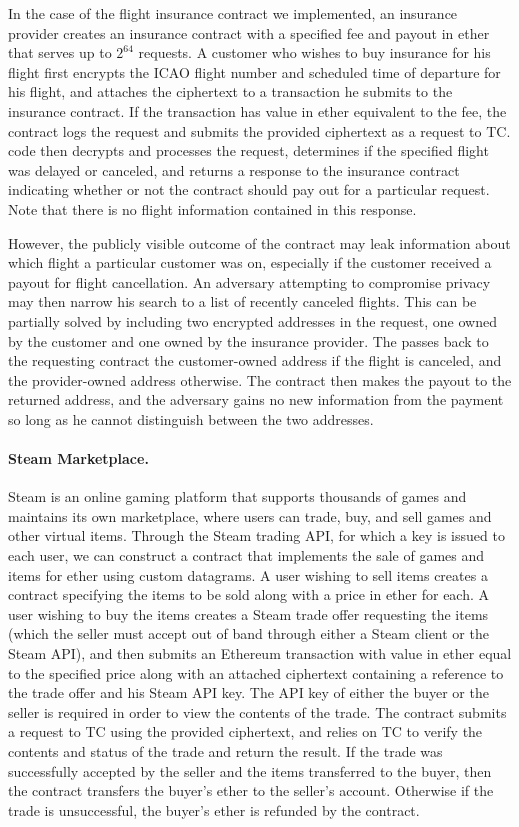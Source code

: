 In the case of the flight insurance contract we implemented, an insurance provider creates an insurance contract with a specified fee and payout in ether that serves up to $2^{64}$ requests.  A customer who wishes to buy insurance for his flight first encrypts the ICAO flight number and scheduled time of departure for his flight, and attaches the ciphertext to a transaction he submits to the insurance contract.  If the transaction has value in ether equivalent to the fee, the contract logs the request and submits the provided ciphertext as a request to TC.  \encname code then decrypts and processes the request, determines if the specified flight was delayed or canceled, and returns a response to the insurance contract indicating whether or not the contract should pay out for a particular request.  Note that there is no flight information contained in this response.

However, the publicly visible outcome of the contract may leak information about which flight a particular customer was on, especially if the customer received a payout for flight cancellation.  An adversary attempting to compromise privacy may then narrow his search to a list of recently canceled flights.  This can be partially solved by including two encrypted addresses in the request, one owned by the customer and one owned by the insurance provider.  The \encname passes back to the requesting contract the customer-owned address if the flight is canceled, and the provider-owned address otherwise.  The contract then makes the payout to the returned address, and the adversary gains no new information from the payment so long as he cannot distinguish between the two addresses.

\paragraph{Steam Marketplace.} Steam  is an online gaming platform that supports thousands of games and maintains its own marketplace, where users can trade, buy, and sell games and other virtual items.  Through the Steam trading API, for which a key is issued to each user, we can construct a contract that implements the sale of games and items for ether using custom datagrams.  A user wishing to sell items creates a contract specifying the items to be sold along with a price in ether for each.  A user wishing to buy the items creates a Steam trade offer requesting the items (which the seller must accept out of band through either a Steam client or the Steam API), and then submits an Ethereum transaction with value in ether equal to the specified price along with an attached ciphertext containing a reference to the trade offer and his Steam API key.  The API key of either the buyer or the seller is required in order to view the contents of the trade.  The contract submits a request to TC using the provided ciphertext, and relies on TC to verify the contents and status of the trade and return the result.  If the trade was successfully accepted by the seller and the items transferred to the buyer, then the contract transfers the buyer's ether to the seller's account.  Otherwise if the trade is unsuccessful, the buyer's ether is refunded by the contract.

